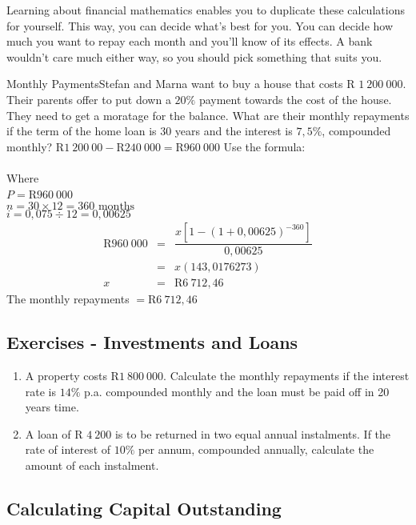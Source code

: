 Learning about financial mathematics enables you to duplicate these calculations for yourself. This way, you can decide what's best for you. You can decide how much you want to repay each month and you'll know of its effects. A bank wouldn't care much either way, so you should pick something that suits you.

\begin{wex}{Monthly Payments}{Stefan and Marna want to buy a house that costs R $1~200~000$. Their parents offer to put down a $20\%$ payment towards the cost of the house.  They need to get a moratage for the balance.  What are their monthly repayments if the term of the home loan is 30 years and the interest is $7,5\%$, compounded monthly?}
{
R$ 1~200~00 - $R$ 240~000 = $R$ 960~000$
Use the formula: \\
\\
Where \\
$P = $R$960~000$\\
$n = 30 \times 12 = 360 \mbox{ months}$\\
$i = 0,075 \div 12 = 0,00625$
\begin{eqnarray*}
\mbox{R}960~000&=& \dfrac{x[1-(1 + 0,00625)^{-360}]}{0,00625}\\
&=&x(143,0176273)\\
x&=&\mbox{R} 6~712,46
\end{eqnarray*}
The monthly repayments $= $R$6~712,46$
}
\end{wex}

\subsection{Exercises - Investments and Loans}
\begin{enumerate}
\item{A property costs R$1~800~000$.  Calculate the monthly repayments if the interest rate is $14\%$ p.a. compounded monthly and the loan must be paid off in 20 years time.}
\item{A loan of R $4~200$ is to be returned in two equal annual instalments.  If the rate of interest of $10\%$ per annum, compounded annually, calculate the amount of each instalment.}
\end{enumerate}


\subsection{Calculating Capital Outstanding}
\label{ss:capitaloutstanding}

